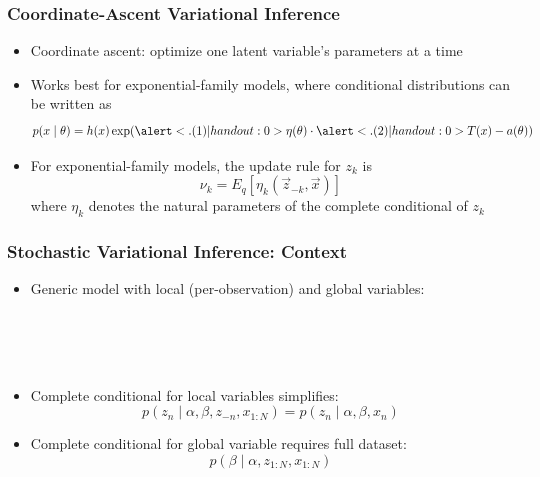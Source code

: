 \begin{frame}
\frametitle{Coordinate-Ascent Variational Inference}
\begin{itemize}[<+->]
\item Coordinate ascent: optimize one latent variable's parameters at a time
\item Works best for exponential-family models, where conditional distributions can be written as
\[ p(x \mid \theta) = h(x) \exp( \alert<.(1)| handout:0>{\eta(\theta)} \cdot \alert<.(2)| handout:0>{T(x)} - a(\theta)) \]
 \pause
\item For exponential-family models, the update rule for $z_k$ is
\[ \nu_k = E_q[\eta_k(\vec z_{-k}, \vec x)] \]
where $\eta_k$ denotes the natural parameters of the complete conditional of $z_k$
\end{itemize}
\end{frame}

\begin{frame}
\frametitle{Stochastic Variational Inference: Context}
\begin{itemize}[<+->]
\item Generic model with local (per-observation) and global variables:
\begin{center}
\end{center}
 \\
 \\
 \\
\item Complete conditional for local variables simplifies:
\[ p(z_n \mid \alpha, \beta, z_{-n}, x_{1:N}) = p(z_n \mid \alpha, \beta, x_n) \]
\item Complete conditional for global variable requires full dataset:
\[ p(\beta \mid \alpha, z_{1:N}, x_{1:N}) \]
\end{itemize}
\end{frame}

